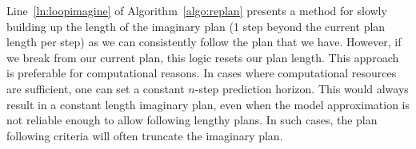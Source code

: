 \documentclass{article}
\DeclareMathOperator*{\argmax}{arg\,max}
\begin{document}

        Line~\ref{ln:loopimagine} of Algorithm~\ref{algo:replan} presents a method for slowly building up the length of the imaginary plan (1 step beyond the current plan length per step) as we can consistently follow the plan that we have. However, if we break from our current plan, this logic resets our plan length. This approach is preferable for computational reasons. In cases where computational resources are sufficient, one can set a constant $n$-step prediction horizon. This would always result in a constant length imaginary plan, even when the model approximation is not reliable enough to allow following lengthy plans. In such cases, the plan following criteria will often truncate the imaginary plan.  
\end{document}
